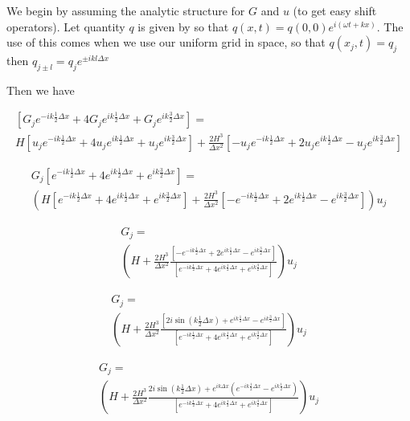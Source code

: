 \documentclass[12pt]{article}
\begin{document}
We begin by assuming the analytic structure for $G$ and $u$ (to get easy shift operators).
Let quantity $q$ is given by so that
$q(x,t) = q(0,0) e^{i\left(\omega t + kx\right)}$. The use of this comes when we use our uniform grid in space, so that $q(x_j,t) = q_j$ then $q_{j \pm l} = q_j e^{\pm ik l\Delta x} $

Then we have 

\begin{multline}
\left[G_j e^{- ik \frac{1}{2}\Delta x} + 4G_j e^{ik \frac{1}{2}\Delta x}  +  G_j e^{ik \frac{3}{2}\Delta x}  \right] = \\ H \left[u_j e^{- ik \frac{1}{2}\Delta x} + 4u_j e^{ik \frac{1}{2}\Delta x}  +  u_j e^{ik \frac{3}{2}\Delta x}  \right] +  \frac{2H^3}{\Delta x^2}\left[-u_j e^{- ik \frac{1}{2}\Delta x}  + 2u_j e^{ik \frac{1}{2}\Delta x} -  u_j e^{ik \frac{3}{2}\Delta x} \right]
\end{multline}

\begin{multline}
G_j\left[e^{- ik \frac{1}{2}\Delta x} + 4 e^{ik \frac{1}{2}\Delta x}  +  e^{ik \frac{3}{2}\Delta x}  \right] = \\ \left( H \left[e^{- ik \frac{1}{2}\Delta x} + 4 e^{ik \frac{1}{2}\Delta x}  +  e^{ik \frac{3}{2}\Delta x}  \right] +  \frac{2H^3}{\Delta x^2}\left[- e^{- ik \frac{1}{2}\Delta x}  + 2 e^{ik \frac{1}{2}\Delta x} -  e^{ik \frac{3}{2}\Delta x} \right] \right)u_j
\end{multline}

\begin{multline}
G_j= \\ \left( H  +  \frac{2H^3}{\Delta x^2}\frac{\left[- e^{- ik \frac{1}{2}\Delta x}  + 2 e^{ik \frac{1}{2}\Delta x} -  e^{ik \frac{3}{2}\Delta x} \right]}{\left[e^{- ik \frac{1}{2}\Delta x} + 4 e^{ik \frac{1}{2}\Delta x}  +  e^{ik \frac{3}{2}\Delta x}  \right]} \right)u_j
\end{multline}

\begin{multline}
G_j= \\ \left( H  +  \frac{2H^3}{\Delta x^2}\frac{\left[2i\sin\left(k \frac{1}{2}\Delta x\right) +  e^{ik \frac{1}{2}\Delta x} -  e^{ik \frac{3}{2}\Delta x} \right]}{\left[e^{- ik \frac{1}{2}\Delta x} + 4 e^{ik \frac{1}{2}\Delta x}  +  e^{ik \frac{3}{2}\Delta x}  \right]} \right)u_j
\end{multline}

\begin{multline}
G_j= \\ \left( H  +  \frac{2H^3}{\Delta x^2}\frac{2i\sin\left(k \frac{1}{2}\Delta x\right) +  e^{ik\Delta x}\left(e^{-ik \frac{1}{2}\Delta x} -  e^{ik \frac{1}{2}\Delta x} \right) }{\left[e^{- ik \frac{1}{2}\Delta x} + 4 e^{ik \frac{1}{2}\Delta x}  +  e^{ik \frac{3}{2}\Delta x}  \right]} \right)u_j
\end{multline}
\end{document}
